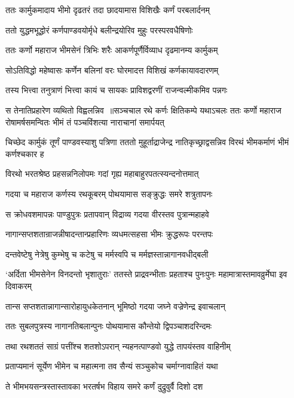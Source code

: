 \twolineshloka
{ततः कार्मुकमादाय भीमो दृढतरं तदा}
{छादयामास विशिखैः कर्णं परबलार्दनम्}


\twolineshloka
{ततो युद्धमभूद्धोरं कर्णपाण्डवयोर्मृधे}
{बलीन्द्रयोरिव मुहुः परस्परवधैषिणोः}


\twolineshloka
{ततः कर्णो महाराज भीमसेनं त्रिभिः शरैः}
{आकर्णपूर्णैर्विव्याध दृढमानम्य कार्मुकम्}


\twolineshloka
{सोऽतिविद्धो महेष्वासः कर्णेन बलिनां वरः}
{घोरमादत्त विशिखं कर्णकायावदारणम्}


\twolineshloka
{तस्य भित्त्वा तनुत्राणं भित्त्वा कायं च सायकः}
{प्राविशद्वरणीं राजन्वल्मीकमिव पन्नगः}


स तेनातिप्रहारेण व्यथितो विह्वलन्निव ॥सञ्चचाल रथे कर्णः क्षितिकम्पे यथाऽचलः
\twolineshloka
{ततः कर्णो महाराज रोषामर्षसमन्वितः}
{भीमं तं पञ्चविंशत्या नाराचानां समार्पयत्}


चिच्छेद कार्मुकं तूर्णं पाण्डवस्याशु पत्रिणा
\twolineshloka
{तततो मुहूर्ताद्राजेन्द्र नातिकृच्छ्राद्वसन्निव}
{विरथं भीमकर्माणं भीमं कर्णश्चकार ह}


\twolineshloka
{विरथो भरतश्रेष्ठ प्रहसन्ननिलोपमः}
{गदां गृह्य महाबाहुरपतत्स्यन्दनोत्तमात्}


\twolineshloka
{गदया च महाराज कर्णस्य रथकूबरम्}
{पोथयामास सङ्क्रुद्धः समरे शत्रुतापनः}


\twolineshloka
{स क्रोधवशमापन्नः पाण्डुपुत्रः प्रतापवान्}
{विद्राव्य गदया वीरस्तव पुत्रान्महाहवे}


\twolineshloka
{नागान्सप्तशतान्राजन्नीषादन्तान्प्रहारिणः}
{व्यधमत्सहसा भीमः क्रुद्धरूपः परन्तपः}


\twolineshloka
{दन्तवेष्टेषु नेत्रेषु कुम्भेषु च कटेषु च}
{मर्मस्वपि च मर्मज्ञस्तान्नागानवधीद्बली}


\threelineshloka
{`अर्दिता भीमसेनेन विनदन्तो भृशातुराः'}
{ततस्ते प्राद्रवन्भीताः प्रहताश्च पुनःपुनः}
{महामात्रास्तमावव्रुर्मेघा इव दिवाकरम्}


\twolineshloka
{तान्स सप्तशतान्नागान्सारोहायुधकेतनान्}
{भूमिष्ठो गदया जघ्ने वज्रेणेन्द्र इवाचलान्}


\twolineshloka
{ततः सुबलपुत्रस्य नागानतिबलान्पुनः}
{पोथयामास कौन्तेयो द्विपञ्चाशदरिन्दमः}


\twolineshloka
{तथा रथशततं साग्रं पत्तींश्च शतशोऽपरान्}
{न्यहनत्पाण्डवो युद्धे तापयंस्तव वाहिनीम्}


\twolineshloka
{प्रताप्यमानं सूर्येण भीमेन च महात्मना}
{तव सैन्यं सञ्चुकोच चर्माग्नावाहितं यथा}


\twolineshloka
{ते भीमभयसन्त्रस्तास्तावका भरतर्षभ}
{विहाय समरे कर्णं दुद्रुवुर्वै दिशो दश}


